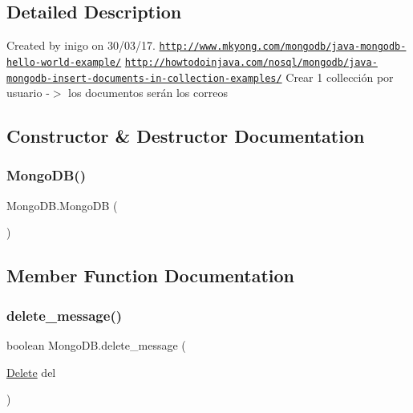\subsection{Detailed Description}
Created by inigo on 30/03/17. \href{http://www.mkyong.com/mongodb/java-mongodb-hello-world-example/}{\tt http\+://www.\+mkyong.\+com/mongodb/java-\/mongodb-\/hello-\/world-\/example/} \href{http://howtodoinjava.com/nosql/mongodb/java-mongodb-insert-documents-in-collection-examples/}{\tt http\+://howtodoinjava.\+com/nosql/mongodb/java-\/mongodb-\/insert-\/documents-\/in-\/collection-\/examples/} Crear 1 collección por usuario -\/$>$ los documentos serán los correos 

\subsection{Constructor \& Destructor Documentation}
\mbox{\label{class_mongo_d_b_a7170cf8463b15fad9f4b8d9373b16201}} 
\subsubsection{\texorpdfstring{Mongo\+D\+B()}{MongoDB()}}
{\footnotesize\ttfamily Mongo\+D\+B.\+Mongo\+DB (\begin{DoxyParamCaption}{ }\end{DoxyParamCaption})}



\subsection{Member Function Documentation}
\mbox{\label{class_mongo_d_b_a1bc531a4e919dd942edeafc749e30f81}} 
\subsubsection{\texorpdfstring{delete\+\_\+message()}{delete\_message()}}
{\footnotesize\ttfamily boolean Mongo\+D\+B.\+delete\+\_\+message (\begin{DoxyParamCaption}\item[{\hyperlink{class_delete}{Delete}}]{del }\end{DoxyParamCaption})}

